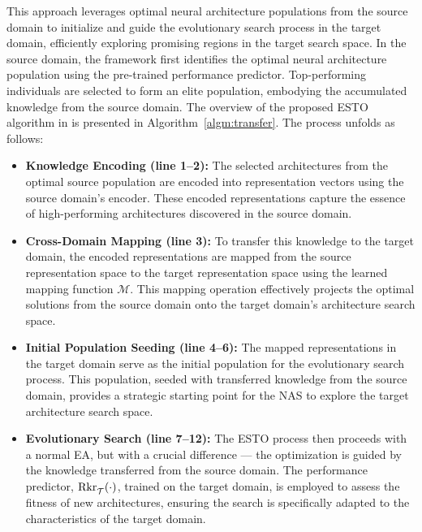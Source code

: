\documentclass[../main.tex]{subfiles}
\begin{document}
This approach leverages optimal neural architecture populations from the source domain to initialize and guide the evolutionary search process in the target domain, efficiently exploring promising regions in the target search space.
In the source domain, the framework first identifies the optimal neural architecture population using the pre-trained performance predictor. Top-performing individuals are selected to form an elite population, embodying the accumulated knowledge from the source domain.
The overview of the proposed ESTO algorithm in \OUR{} is presented in Algorithm~\ref{algm:transfer}. The process unfolds as follows:
\begin{itemize}
  \item \textbf{Knowledge Encoding (line 1--2):} The selected architectures from the optimal source population are encoded into representation vectors using the source domain's encoder. These encoded representations capture the essence of high-performing architectures discovered in the source domain.
  \item \textbf{Cross-Domain Mapping (line 3):} To transfer this knowledge to the target domain, the encoded representations are mapped from the source representation space to the target representation space using the learned mapping function \(\mathcal{M}\). This mapping operation effectively projects the optimal solutions from the source domain onto the target domain's architecture search space.
  \item \textbf{Initial Population Seeding (line 4--6):} The mapped representations in the target domain serve as the initial population for the evolutionary search process. This population, seeded with transferred knowledge from the source domain, provides a strategic starting point for the NAS to explore the target architecture search space.
  \item \textbf{Evolutionary Search (line 7--12):} The ESTO process then proceeds with a normal EA, but with a crucial difference --- the optimization is guided by the knowledge transferred from the source domain.
        The performance predictor, \(\mathrm{Rkr}^{\mathstrut}_{\mathcal{T}}(\cdot)\), trained on the target domain, is employed to assess the fitness of new architectures, ensuring the search is specifically adapted to the characteristics of the target domain.
\end{itemize}
\end{document}
